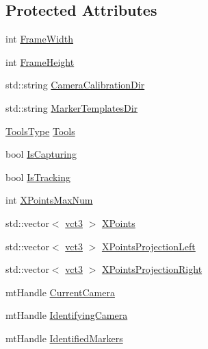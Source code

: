 \subsection*{Protected Attributes}
\begin{DoxyCompactItemize}
\item 
int \hyperlink{classmts_micron_tracker_a5e43bc9b8bfb0ecfa61c31382e371bd0}{Frame\+Width}
\item 
int \hyperlink{classmts_micron_tracker_a5823ad8e94db01e18081a2649b085ffe}{Frame\+Height}
\item 
std\+::string \hyperlink{classmts_micron_tracker_a1107867a28954dd0b2db6c2d42843438}{Camera\+Calibration\+Dir}
\item 
std\+::string \hyperlink{classmts_micron_tracker_ab2b76f57d976389591206c1f1bc3bb35}{Marker\+Templates\+Dir}
\item 
\hyperlink{classmts_micron_tracker_a240bfec6cae665e2f2f53ec31bbcff12}{Tools\+Type} \hyperlink{classmts_micron_tracker_a3da35d113b3b770a7ebc1ddd354cc44b}{Tools}
\item 
bool \hyperlink{classmts_micron_tracker_a333d3b5289a981be85aaa070b2a8d672}{Is\+Capturing}
\item 
bool \hyperlink{classmts_micron_tracker_ab683a357bdbc34205e4156240be69436}{Is\+Tracking}
\item 
int \hyperlink{classmts_micron_tracker_aec7b0fc645223abd56ea77aba3687df8}{X\+Points\+Max\+Num}
\item 
std\+::vector$<$ \hyperlink{vct_fixed_size_vector_types_8h_a3af82acdbf4eeb73c551909240b106ea}{vct3} $>$ \hyperlink{classmts_micron_tracker_a92050577b1193e76a362e8c81708932c}{X\+Points}
\item 
std\+::vector$<$ \hyperlink{vct_fixed_size_vector_types_8h_a3af82acdbf4eeb73c551909240b106ea}{vct3} $>$ \hyperlink{classmts_micron_tracker_a2e35c998885291f730e1a55f990b464d}{X\+Points\+Projection\+Left}
\item 
std\+::vector$<$ \hyperlink{vct_fixed_size_vector_types_8h_a3af82acdbf4eeb73c551909240b106ea}{vct3} $>$ \hyperlink{classmts_micron_tracker_a7e0cac34b4700293cd83d15e57ad057f}{X\+Points\+Projection\+Right}
\item 
mt\+Handle \hyperlink{classmts_micron_tracker_a51945d6df1036a1bd179ed1163cd3eff}{Current\+Camera}
\item 
mt\+Handle \hyperlink{classmts_micron_tracker_a8b664e2a78bd433ddd14c306b093575d}{Identifying\+Camera}
\item 
mt\+Handle \hyperlink{classmts_micron_tracker_a80790bbda44e575b40c4d1041a69e5fa}{Identified\+Markers}

\end{DoxyCompactItemize}
